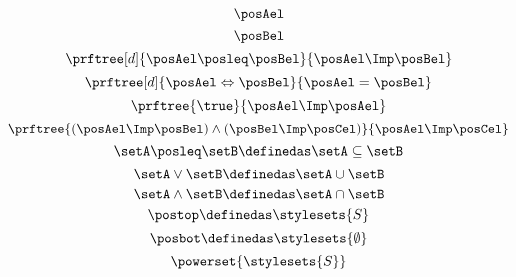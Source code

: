 {\begin{forslides}
\begin{equation*}
            \label{eq:latt_4}
            \posAel
        \end{equation*}
        \begin{equation*}
            \label{eq:latt_5}
            \posBel
        \end{equation*}
        \begin{equation*}
            \label{eq:prop_1}
            \prftree[d]{\posAel \posleq \posBel}{\posAel \Imp \posBel}
        \end{equation*}
        \begin{equation*}
            \label{eq:prop_2}
            \prftree[d]{\posAel \Leftrightarrow \posBel}{\posAel = \posBel}
        \end{equation*}
        \begin{equation*}
            \label{eq:prop_3}
            \prftree{\true}{\posAel \Imp \posAel}
        \end{equation*}
        \begin{equation*}
            \label{eq:prop_4}
            \prftree{(\posAel \Imp \posBel)\wedge (\posBel \Imp \posCel)}{\posAel \Imp \posCel}
        \end{equation*}
        \begin{equation*}
            \label{eq:pow_1}
            \setA \posleq \setB \definedas \setA \subseteq \setB
        \end{equation*}
        \begin{equation*}
            \label{eq:pow_2}
            \setA \vee \setB \definedas \setA \cup \setB
        \end{equation*}
        \begin{equation*}
            \label{eq:pow_3}
            \setA \wedge \setB \definedas \setA \cap \setB
        \end{equation*}
        \begin{equation*}
            \label{eq:pow_4}
            \postop \definedas \stylesets{S}
        \end{equation*}
        \begin{equation*}
            \label{eq:pow_5}
            \posbot \definedas \stylesets{\emptyset}
        \end{equation*}
        \begin{equation*}
            \label{eq:pow_6}
            \powerset{\stylesets{S}}
        \end{equation*}
        \begin{equation*}

\end{equation*}
\end{forslides}}
